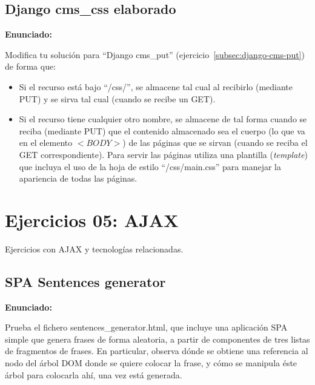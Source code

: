 \subsection{Django cms\_css elaborado}
\label{subsec:django-cms-css-2}

\textbf{Enunciado:}

Modifica tu solución para ``Django cms\_put'' (ejercicio~\ref{subsec:django-cms-put}) de forma que:

\begin{itemize}
\item Si el recurso está bajo ``/css/'', se almacene tal cual al recibirlo (mediante PUT) y se sirva tal cual (cuando se recibe un GET).
\item Si el recurso tiene cualquier otro nombre, se almacene de tal forma cuando se reciba (mediante PUT) que el contenido almacenado sea el cuerpo (lo que va en el elemento $<BODY>$) de las páginas que se sirvan (cuando se reciba el GET correspondiente). Para servir las páginas utiliza una plantilla (\emph{template}) que incluya el uso de la hoja de estilo ``/css/main.css'' para manejar la apariencia de todas las páginas.
\end{itemize}

\section{Ejercicios 05: AJAX}

Ejercicios con AJAX y tecnologías relacionadas.

\subsection{SPA Sentences generator}
\label{subsec:spa-sentences-generator}

\textbf{Enunciado:}

Prueba el fichero sentences\_generator.html, que incluye una aplicación SPA simple que genera frases de forma aleatoria, a partir de componentes de tres listas de fragmentos de frases. En particular, observa dónde se obtiene una referencia al nodo del árbol DOM donde se quiere colocar la frase, y cómo se manipula éste árbol para colocarla ahí, una vez está generada.

